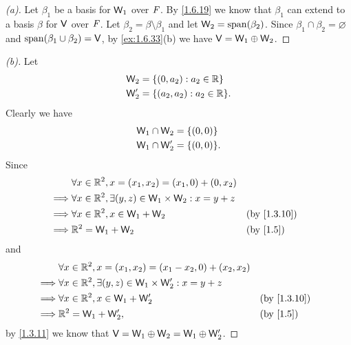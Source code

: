 \begin{proof}[(a)]
  Let \(\beta_1\) be a basis for \(\mathsf{W}_1\) over \(\mathit{F}\).
  By \cref{1.6.19} we know that \(\beta_1\) can extend to a basis \(\beta\) for \(\mathsf{V}\) over \(\mathit{F}\).
  Let \(\beta_2 = \beta \setminus \beta_1\) and let \(\W_2 = \spn{\beta_2}\).
  Since \(\beta_1 \cap \beta_2 = \varnothing\) and \(\spn{\beta_1 \cup \beta_2} = \V\), by \cref{ex:1.6.33}(b) we have \(\mathsf{V} = \mathsf{W}_1 \oplus \mathsf{W}_2\).
\end{proof}

\begin{proof}[(b)]
  Let
  \begin{align*}
    \W_2  & = \set{(0, a_2) : a_2 \in \R}    \\
    \W_2' & = \set{(a_2, a_2) : a_2 \in \R}.
  \end{align*}
  Clearly we have
  \begin{align*}
    \W_1 \cap \W_2  & = \set{(0, 0)}  \\
    \W_1 \cap \W_2' & = \set{(0, 0)}.
  \end{align*}
  Since
  \begin{align*}
             & \forall x \in \R^2, x = (x_1, x_2) = (x_1, 0) + (0, x_2)                             \\
    \implies & \forall x \in \R^2, \exists (y, z) \in \W_1 \times \W_2 : x = y + z                  \\
    \implies & \forall x \in \R^2, x \in \W_1 + \W_2                               &  & \by{1.3.10} \\
    \implies & \R^2 = \W_1 + \W_2                                                  &  & \by{1.5}
  \end{align*}
  and
  \begin{align*}
             & \forall x \in \R^2, x = (x_1, x_2) = (x_1 - x_2, 0) + (x_2, x_2)                      \\
    \implies & \forall x \in \R^2, \exists (y, z) \in \W_1 \times \W_2' : x = y + z                  \\
    \implies & \forall x \in \R^2, x \in \W_1 + \W_2'                               &  & \by{1.3.10} \\
    \implies & \R^2 = \W_1 + \W_2',                                                 &  & \by{1.5}
  \end{align*}
  by \cref{1.3.11} we know that \(\mathsf{V} = \mathsf{W}_1 \oplus \mathsf{W}_2 = \mathsf{W}_1 \oplus \mathsf{W}_2'\).
\end{proof}

